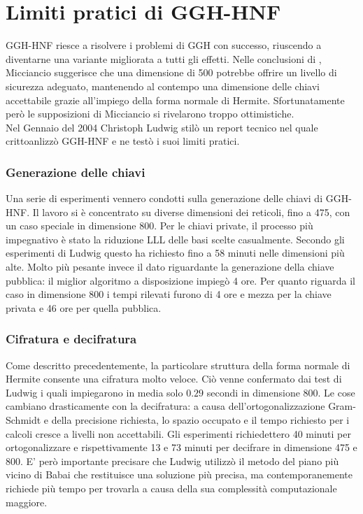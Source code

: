 \section{Limiti pratici di GGH-HNF}
\label{sec:HNFLimits}
GGH-HNF riesce a risolvere i problemi di GGH con successo, riuscendo a diventarne una variante migliorata
a tutti gli effetti. Nelle conclusioni di \cite{HNF01}, Micciancio suggerisce che una dimensione di 
500 potrebbe offrire un livello di sicurezza adeguato, mantenendo al contempo una dimensione delle 
chiavi accettabile grazie all'impiego della forma normale di Hermite. Sfortunatamente però le 
supposizioni di Micciancio si rivelarono troppo ottimistiche. \\
Nel Gennaio del 2004 Christoph Ludwig stilò un report tecnico \cite{HNF04} nel quale crittoanlizzò
GGH-HNF e ne testò i suoi limiti pratici. 

\subsubsection{Generazione delle chiavi}
Una serie di esperimenti vennero condotti sulla generazione delle chiavi di GGH-HNF.
Il lavoro si è concentrato su diverse dimensioni dei reticoli, fino a 475, 
con un caso speciale in dimensione 800.
Per le chiavi private, il processo più impegnativo è stato la riduzione LLL delle basi scelte 
casualmente. Secondo gli esperimenti di Ludwig questo ha richiesto fino a 58 minuti nelle dimensioni più alte.
Molto più pesante invece il dato riguardante la generazione della chiave pubblica: il miglior algoritmo
a disposizione impiegò 4 ore. Per quanto riguarda il caso in dimensione 800 i tempi rilevati furono
di 4 ore e mezza per la chiave privata e 46 ore per quella pubblica.

\subsubsection{Cifratura e decifratura}
Come descritto precedentemente, la particolare struttura della forma normale di Hermite consente una
cifratura molto veloce. Ciò venne confermato dai test di Ludwig i quali impiegarono in media solo $0.29$
secondi in dimensione 800. Le cose cambiano drasticamente con la decifratura: a causa dell'ortogonalizzazione
Gram-Schmidt e della precisione richiesta, lo spazio occupato e il tempo richiesto per i calcoli
cresce a livelli non accettabili. Gli esperimenti richiedettero 40 minuti per ortogonalizzare
e rispettivamente 13 e 73 minuti per decifrare in dimensione 475 e 800. E' però importante precisare
che Ludwig utilizzò il metodo del piano più vicino di Babai che restituisce una soluzione più precisa, 
ma contemporanemente richiede più tempo per trovarla a causa della sua complessità computazionale maggiore. 

